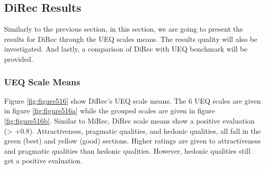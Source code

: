 \subsection{DiRec Results}
Similarly to the previous section, in this section, we are going to present the
results for DiRec through the UEQ scales means. The results quality will also be
investigated. And lastly, a comparison of DiRec with UEQ benchmark will be
provided.
\subsubsection{UEQ Scale Means}
Figure \ref{fig:figure516} show DiRec's UEQ scale means. The 6 UEQ scales are
given in figure \ref{fig:figure516a} while the grouped scales are given in
figure \ref{fig:figure516b}. Similar to MiRec, DiRec scale means show a
positive evaluation (> +0.8). Attractiveness, pragmatic qualities, and hedonic qualities,
all fall in the green (best) and yellow (good) sections. Higher ratings are
given to attractiveness and pragmatic qualities than hedonic qualities. However,
hedonic qualities still get a positive evaluation.
